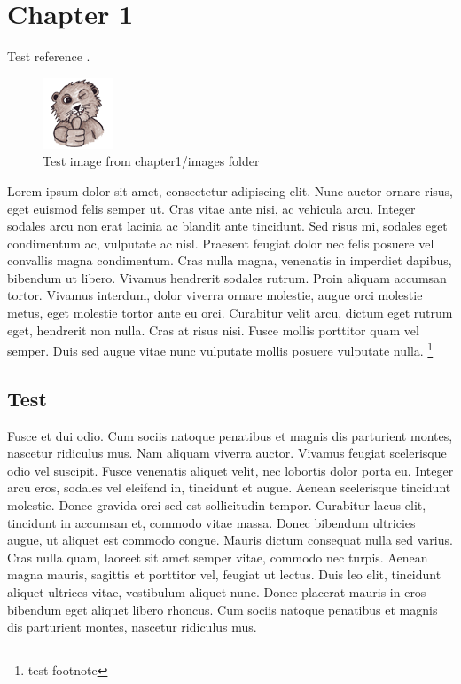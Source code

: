\chapter{Chapter 1}

Test reference \cite{thesistpl}.

\begin{figure}[H]
	\begin{center}
		\includegraphics{content/chapter1/images/beaver}
		\caption{Test image from chapter1/images folder}
	\end{center}
\end{figure}

Lorem ipsum dolor sit amet, consectetur adipiscing elit. Nunc auctor ornare risus, eget euismod felis semper ut. Cras vitae ante nisi, ac vehicula arcu. Integer sodales arcu non erat lacinia ac blandit ante tincidunt. Sed risus mi, sodales eget condimentum ac, vulputate ac nisl. Praesent feugiat dolor nec felis posuere vel convallis magna condimentum. Cras nulla magna, venenatis in imperdiet dapibus, bibendum ut libero. Vivamus hendrerit sodales rutrum. Proin aliquam accumsan tortor. Vivamus interdum, dolor viverra ornare molestie, augue orci molestie metus, eget molestie tortor ante eu orci. Curabitur velit arcu, dictum eget rutrum eget, hendrerit non nulla. Cras at risus nisi. Fusce mollis porttitor quam vel semper. Duis sed augue vitae nunc vulputate mollis posuere vulputate nulla. \footnote{test footnote}

\section{Test}

Fusce et dui odio. Cum sociis natoque penatibus et magnis dis parturient montes, nascetur ridiculus mus. Nam aliquam viverra auctor. Vivamus feugiat scelerisque odio vel suscipit. Fusce venenatis aliquet velit, nec lobortis dolor porta eu. Integer arcu eros, sodales vel eleifend in, tincidunt et augue. Aenean scelerisque tincidunt molestie. Donec gravida orci sed est sollicitudin tempor. Curabitur lacus elit, tincidunt in accumsan et, commodo vitae massa. Donec bibendum ultricies augue, ut aliquet est commodo congue. Mauris dictum consequat nulla sed varius. Cras nulla quam, laoreet sit amet semper vitae, commodo nec turpis. Aenean magna mauris, sagittis et porttitor vel, feugiat ut lectus. Duis leo elit, tincidunt aliquet ultrices vitae, vestibulum aliquet nunc. Donec placerat mauris in eros bibendum eget aliquet libero rhoncus. Cum sociis natoque penatibus et magnis dis parturient montes, nascetur ridiculus mus.

